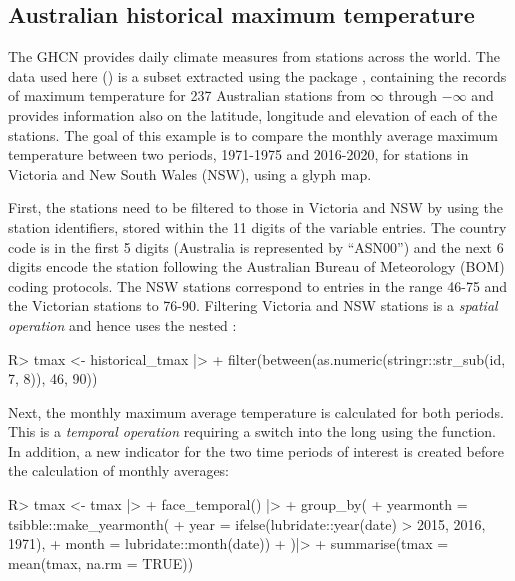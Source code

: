 \documentclass[
  shortnames]{jss}
\begin{document}
\hypertarget{historicaltmax}{%
\subsection{Australian historical maximum temperature}\label{historicaltmax}}

The GHCN provides daily climate measures from stations across the world. The data used here () is a subset extracted using the package  \citep{rnoaa}, containing the records of maximum temperature for 237 Australian stations from \ensuremath{\infty{}} through \ensuremath{-\infty{}} and provides information also on the latitude, longitude and elevation of each of the stations. The goal of this example is to compare the monthly average maximum temperature between two periods, 1971-1975 and 2016-2020, for stations in Victoria and New South Wales (NSW), using a glyph map.

First, the stations need to be filtered to those in Victoria and NSW by using the station identifiers, stored within the 11 digits of the  variable entries. The country code is in the first 5 digits (Australia is represented by ``ASN00'') and the next 6 digits encode the station following the Australian Bureau of Meteorology (BOM) \citep{bom} coding protocols. The NSW stations correspond to entries in the range 46-75 and the Victorian stations to 76-90. Filtering Victoria and NSW stations is a \emph{spatial operation} and hence uses the nested :

\begin{CodeChunk}
\begin{CodeInput}
R> tmax <- historical_tmax |>
+   filter(between(as.numeric(stringr::str_sub(id, 7, 8)), 46, 90))
\end{CodeInput}
\end{CodeChunk}

Next, the monthly maximum average temperature is calculated for both periods. This is a \emph{temporal operation} requiring a switch into the long  using the  function. In addition, a new indicator for the two time periods of interest is created before the calculation of monthly averages:

\begin{CodeChunk}
\begin{CodeInput}
R> tmax <- tmax |>
+   face_temporal() |> 
+   group_by(
+     yearmonth = tsibble::make_yearmonth(
+       year = ifelse(lubridate::year(date) > 2015, 2016, 1971),
+       month = lubridate::month(date))
+     )|>
+   summarise(tmax = mean(tmax, na.rm = TRUE))
\end{CodeInput}
\end{CodeChunk}
\end{document}
